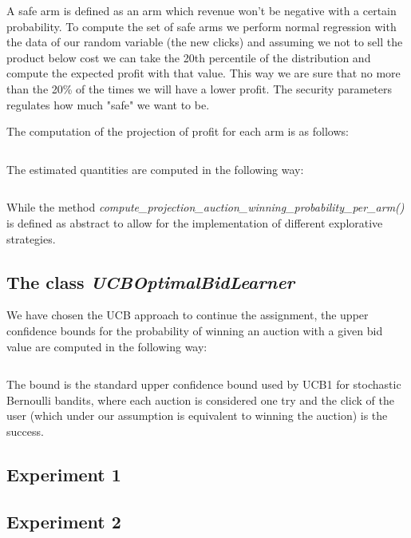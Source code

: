 \documentclass[11pt]{article} %
\begin{document}
A safe arm is defined as an arm which revenue won't be negative with a certain probability. To compute the set of safe
arms we perform normal regression with the data of our random variable (the new clicks) and assuming we not to sell the
product below cost we can take the 20th percentile of the distribution and compute the expected profit with that value.
This way we are sure that no more than the 20\% of the times we will have a lower profit. The security parameters
regulates how much "safe" we want to be.

The computation of the projection of profit for each arm is as follows:

\inputminted{python}{code/step5_projected_profit.py}

\begin{samepage}
The estimated quantities are computed in the following way:
\inputminted{python}{code/step5_estimated_quantities.py}
\end{samepage}
While the method \textit{compute\_projection\_auction\_winning\_probability\_per\_arm()} is defined as abstract to allow for the implementation of different explorative strategies.

\subsection{The class \textit{UCBOptimalBidLearner}}
We have chosen the UCB approach to continue the assignment, the upper confidence bounds for the probability of winning an auction with a given bid value are computed in the following way:

\inputminted{python}{code/step5_ucb_win_prob.py}

The bound is the standard upper confidence bound used by UCB1 for stochastic Bernoulli bandits, where each auction is considered one try and the click of the user (which under our assumption is equivalent to winning the auction) is the success.

\clearpage
\subsection{Experiment 1}

\clearpage

{\footnotesize}

\clearpage
\subsection{Experiment 2}
\end{document}
